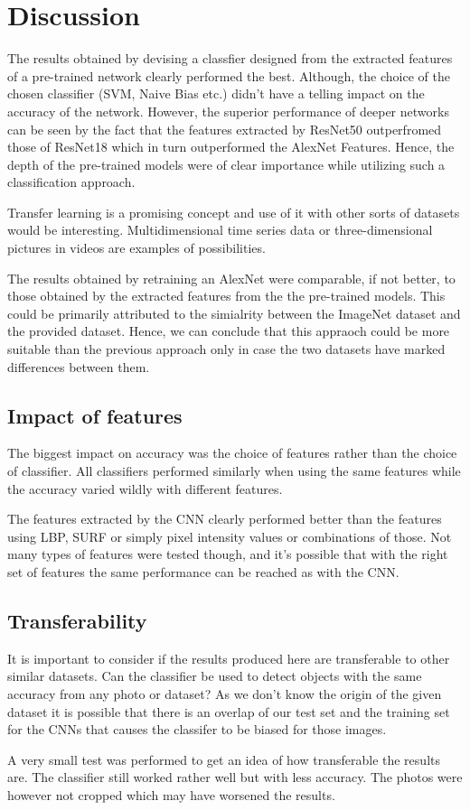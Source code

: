 \documentclass[doc/report.tex]{subfiles}
\begin{document}
\section{Discussion}
The results obtained by devising a classfier designed from the extracted
features of a pre-trained network clearly performed the best. Although, the
choice of the chosen classifier (SVM, Naive Bias etc.) didn't have a telling
impact on the accuracy of the network. However, the superior performance of
deeper networks can be seen by the fact that the features extracted by ResNet50
outperfromed those of ResNet18 which in turn outperformed the AlexNet Features.
Hence, the depth of the pre-trained models were of clear importance while
utilizing such a classification approach.

Transfer learning is a promising concept and use of it with other sorts of datasets would be interesting. Multidimensional time series data or three-dimensional pictures in videos are examples of possibilities.

The results obtained by retraining an AlexNet were comparable, if not better,
to those obtained by the extracted features from the the pre-trained models.
This could be primarily attributed to the simialrity between the ImageNet
dataset and the provided dataset. Hence, we can conclude that this appraoch
could be more suitable than the previous approach only in case the two datasets
have marked differences between them.  

\subsection{Impact of features}
The biggest impact on accuracy was the choice of features rather than the
choice of classifier. All classifiers performed similarly when using the same
features while the accuracy varied wildly with different features.

The features extracted by the CNN clearly performed better than the features
using LBP, SURF or simply pixel intensity values or combinations of those. Not
many types of features were tested though, and it's possible that with the
right set of features the same performance can be reached as with the CNN.

\subsection{Transferability}
It is important to consider if the results produced here are transferable to
other similar datasets. Can the classifier be used to detect objects with the
same accuracy from any photo or dataset? As we don't know the origin of the
given dataset it is possible that there is an overlap of our test set and the
training set for the CNNs that causes the classifer to be biased for those
images.

A very small test was performed to get an idea of how transferable the results
are. The classifier still worked rather well but with less accuracy. The photos
were however not cropped which may have worsened the results. 
    
\end{document}

